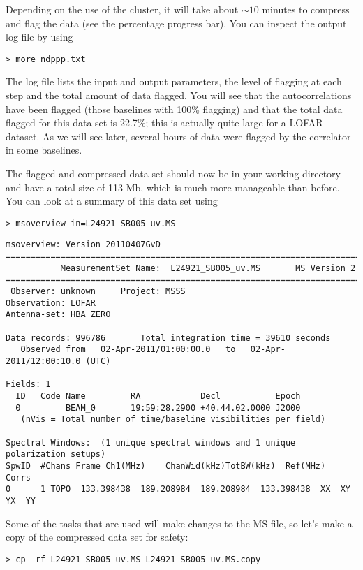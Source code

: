 Depending on the use of the cluster, it will take about $\sim10$ minutes to compress and flag the data (see the percentage progress bar). You can inspect the output log file by using
\begin{verbatim}
> more ndppp.txt
\end{verbatim}

The log file lists the input and output parameters, the level of flagging at each step and the total amount of data flagged. You will see that the autocorrelations have been flagged (those baselines with 100\% flagging) and that the total data flagged for this data set is 22.7\%; this is actually quite large for a LOFAR dataset. As we will see later, several hours of data were flagged by the correlator in some baselines.

The flagged and compressed data set should now be in your working directory and have a total size of 113 Mb, which is much more manageable than before. You can look at a summary of this data set using
\begin{verbatim}
> msoverview in=L24921_SB005_uv.MS
\end{verbatim}
\begin{lstlisting}
msoverview: Version 20110407GvD
=======================================================================
           MeasurementSet Name:  L24921_SB005_uv.MS       MS Version 2
=======================================================================
 Observer: unknown     Project: MSSS  
Observation: LOFAR
Antenna-set: HBA_ZERO

Data records: 996786       Total integration time = 39610 seconds
   Observed from   02-Apr-2011/01:00:00.0   to   02-Apr-2011/12:00:10.0 (UTC)

Fields: 1
  ID   Code Name         RA            Decl           Epoch   
  0         BEAM_0       19:59:28.2900 +40.44.02.0000 J2000   
   (nVis = Total number of time/baseline visibilities per field) 

Spectral Windows:  (1 unique spectral windows and 1 unique polarization setups)
SpwID  #Chans Frame Ch1(MHz)    ChanWid(kHz)TotBW(kHz)  Ref(MHz)    Corrs           
0      1 TOPO  133.398438  189.208984  189.208984  133.398438  XX  XY  YX  YY  
\end{lstlisting}

Some of the tasks that are used will make changes to the MS file, so let's make a copy of the compressed data set for safety:
\begin{verbatim}
> cp -rf L24921_SB005_uv.MS L24921_SB005_uv.MS.copy
\end{verbatim}


